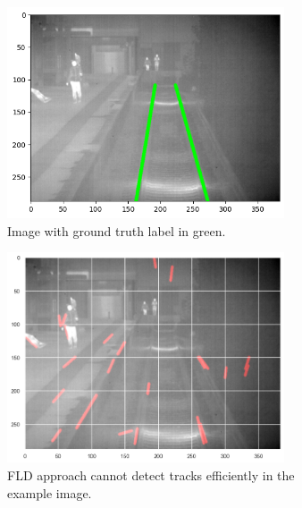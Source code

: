 \documentclass[Master,MDS,english]{BASE/twbook} %
\begin{document}
\begin{figure}
\centering
\begin{subfigure}[t]{.33\textwidth}
  \centering
  \includegraphics[width=0.9\textwidth]{images/results/example_4_gt}
  \caption{Image with ground truth label in green.}
\end{subfigure}%
\begin{subfigure}[t]{.33\textwidth}
  \centering
  \includegraphics[width=0.9\textwidth]{images/results/example_4_fld}
  \caption{FLD approach cannot detect tracks efficiently in the example image.}
\end{subfigure}%
\begin{subfigure}[t]{.33\textwidth}
  \centering

\end{subfigure}
\end{figure}
\end{document}
